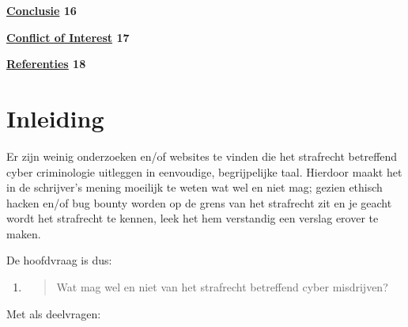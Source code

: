 \documentclass[
]{article}
\begin{document}
\textbf{\protect\hyperlink{conclusie}{Conclusie} 16}

\textbf{\protect\hyperlink{conflict-of-interest}{Conflict of Interest}
17}

\textbf{\protect\hyperlink{referenties}{Referenties} 18}
\pagebreak
\hypertarget{inleiding}{%
\section{Inleiding}\label{inleiding}}

Er zijn weinig onderzoeken en/of websites te vinden die het strafrecht
betreffend cyber criminologie uitleggen in eenvoudige, begrijpelijke
taal. Hierdoor maakt het in de schrijver's mening moeilijk te weten wat
wel en niet mag; gezien ethisch hacken en/of bug bounty worden op de
grens van het strafrecht zit en je geacht wordt het strafrecht te
kennen, leek het hem verstandig een verslag erover te maken.

De hoofdvraag is dus:

\begin{enumerate}
\def\labelenumi{\arabic{enumi}.}
\item
  \begin{quote}
  Wat mag wel en niet van het strafrecht betreffend cyber misdrijven?
  \end{quote}
\end{enumerate}

Met als deelvragen:
\end{document}
